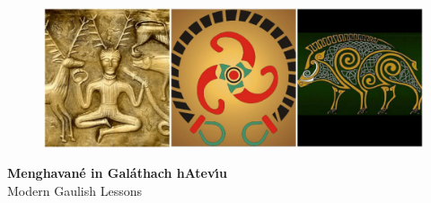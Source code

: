 \thispagestyle{empty} %

\begin{center}

\begin{figure}[H]
\centering
\includegraphics[width=16.0cm]{img/triple-image-banner.eps}
\end{figure}

\textbf{\Huge Menghavan\'{e} in Gal\'{a}thach hAtev\'{\i}u}\\
{\huge Modern Gaulish Lessons}\\

\vspace*{\fill}

\end{center}
